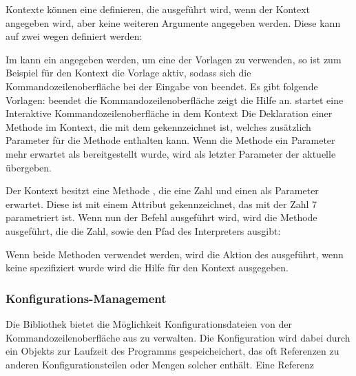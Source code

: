 Kontexte können eine  definieren, die ausgeführt wird, wenn der Kontext angegeben wird, aber keine weiteren Argumente angegeben werden.
Diese kann auf zwei wegen definiert werden:
\begin{outline}
 \1 Im  kann ein  angegeben werden, um eine der Vorlagen zu verwenden, 
 so ist zum Beispiel für den  Kontext die  Vorlage aktiv,
 sodass sich die Kommandozeilenoberfläche bei der Eingabe von  beendet.
 Es gibt folgende Vorlagen:
 \2  beendet die Kommandozeilenoberfläche
 \2  zeigt die Hilfe an.
 \2  startet eine Interaktive Kommandozeilenoberfläche in dem Kontext 
 \1 Die Deklaration einer Methode im Kontext, die mit dem  gekennzeichnet ist,
 welches zusätzlich Parameter für die Methode enthalten kann.
 Wenn die Methode ein Parameter mehr erwartet als bereitgestellt wurde, wird als letzter Parameter der aktuelle  übergeben.
 
 Der  Kontext besitzt eine Methode , die eine Zahl und einen  als Parameter erwartet.
 Diese ist mit einem  Attribut gekennzeichnet, das mit der Zahl 7 parametriert ist.
 Wenn nun der Befehl  ausgeführt wird, wird die  Methode ausgeführt, die die Zahl, sowie den Pfad des Interpreters ausgibt:
\end{outline}
 Wenn beide Methoden verwendet werden, wird die Aktion des  ausgeführt, wenn keine spezifiziert wurde wird die Hilfe für den Kontext ausgegeben.

\subsubsection{Konfigurations-Management}\label{ConfigurationManagement}
Die Bibliothek bietet die Möglichkeit Konfigurationsdateien von der Kommandozeilenoberfläche aus zu verwalten.
Die Konfiguration wird dabei durch ein Objekts zur Laufzeit des Programms gespeicheichert, das oft Referenzen zu anderen Konfigurationsteilen oder Mengen solcher enthält.
Eine Referenz

